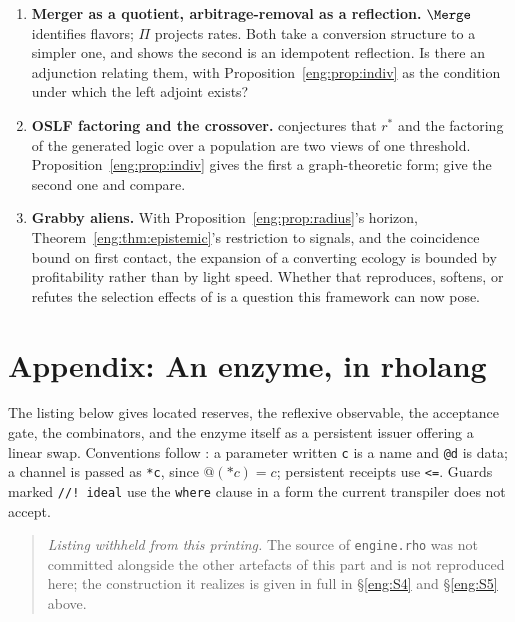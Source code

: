 \begin{enumerate}[itemsep=4pt]
channel --- so a learner must do science on its own medium. This is a
correction owed to \S\ref{sci:S4} of \chSci rather than a problem for this
note, and we flag it here because this note is what raises it.
\item \textbf{Merger as a quotient, arbitrage-removal as a reflection.}
$\Merge$ identifies flavors; $\Pi$ projects rates. Both take a conversion
structure to a simpler one, and \cite[\S4]{vtok} shows the second is an
idempotent reflection. Is there an adjunction relating them, with
Proposition~\ref{eng:prop:indiv} as the condition under which the left adjoint
exists?
\item \textbf{OSLF factoring and the crossover.} \cite{compaut} conjectures
that $r^\ast$ and the factoring of the generated logic over a population
are two views of one threshold. Proposition~\ref{eng:prop:indiv} gives the
first a graph-theoretic form; give the second one and compare.
\item \textbf{Grabby aliens.} With Proposition~\ref{eng:prop:radius}'s horizon,
Theorem~\ref{eng:thm:epistemic}'s restriction to signals, and the coincidence
bound on first contact, the expansion of a converting ecology is bounded by
profitability rather than by light speed. Whether that reproduces, softens,
or refutes the selection effects of \cite{hanson} is a question this
framework can now pose.
\end{enumerate}


\section{Appendix: An enzyme, in rholang}\label{eng:S15}
\label{eng:app:rho}

The listing below gives located reserves, the reflexive observable, the
acceptance gate, the combinators, and the enzyme itself as a persistent
issuer offering a linear swap. Conventions follow \chGame: a parameter
written \texttt{c} is a name and \texttt{@d} is data; a channel is passed as
\texttt{*c}, since $@(*c) = c$; persistent receipts use \texttt{<=}.
Guards marked \texttt{//! ideal} use the \texttt{where} clause in a form the
current transpiler does not accept.

\begin{quote}
\small
\emph{Listing withheld from this printing.} The source of \texttt{engine.rho} was not committed alongside the other artefacts of this part and is not reproduced here; the construction it realizes is given in full in \S\ref{eng:S4} and \S\ref{eng:S5} above.
\end{quote}

